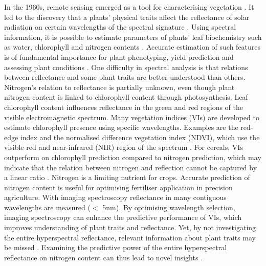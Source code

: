 \documentclass{isprs}
\begin{document}
In the 1960s, remote sensing emerged as a tool for characterising vegetation \cite{Houborg2015}. It led to the discovery that a plants' physical traits affect the reflectance of solar radiation on certain wavelengths of the spectral signature \cite{Knipling1970}. Using spectral information, it is possible to estimate parameters of plants' leaf biochemistry such as water, chlorophyll and nitrogen contents \cite{Hansen2003,Thorp2015}. Accurate estimation of such features is of fundamental importance for plant phenotyping, yield prediction and assessing plant conditions \cite{Diaz2016,Jay2017}. One difficulty in spectral analysis is that relations between reflectance and some plant traits are better understood than others. Nitrogen's relation to reflectance is partially unknown, even though plant nitrogen content is linked to chlorophyll content through photosynthesis. Leaf chlorophyll content influences reflectance in the green and red regions of the visible electromagnetic spectrum. Many vegetation indices (VIs) are developed to estimate chlorophyll presence using specific wavelengths. Examples are the red-edge index and the normalised difference vegetation index (NDVI), which use the visible red and near-infrared (NIR) region of the spectrum \cite{Elarab2015,Kooistra2016,Xue2017}. For cereals, VIs outperform on chlorophyll prediction compared to nitrogen prediction, which may indicate that the relation between nitrogen and reflection cannot be captured by a linear ratio \cite{Li2010}. Nitrogen is a limiting nutrient for crops. Accurate prediction of nitrogen content is useful for optimising fertiliser application in precision agriculture. With imaging spectroscopy reflectance in many contiguous wavelengths are measured ($<$ 5nm). By optimising wavelength selection, imaging spectroscopy can enhance the predictive performance of VIs, which improves understanding of plant traits and reflectance. Yet, by not investigating the entire hyperspectral reflectance, relevant information about plant traits may be missed \cite{Hansen2003}. Examining the predictive power of the entire hyperspectral reflectance on nitrogen content can thus lead to novel insights \cite{Hansen2003,Kitchen2010,Mulla2013,Nasi2017}.

\vspace{4mm}
\end{document}
